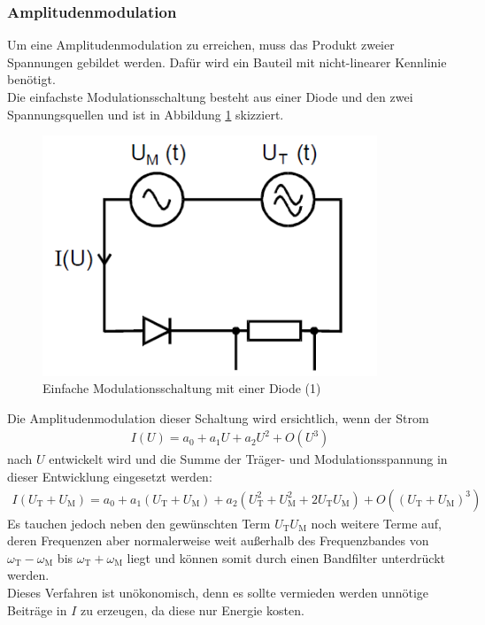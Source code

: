 \documentclass[]{scrartcl}
\begin{document}
\subsubsection*{Amplitudenmodulation}
Um eine Amplitudenmodulation zu erreichen, muss das Produkt zweier Spannungen gebildet werden. Dafür wird ein Bauteil mit nicht-linearer Kennlinie benötigt.\\
Die einfachste Modulationsschaltung besteht aus einer Diode und den zwei Spannungsquellen und ist in Abbildung \ref{fig:einfachemodulation} skizziert.
\begin{figure}[H]
\centering 
\includegraphics[width=10cm]{images/primitive_modulationsschaltung.png}
\caption{Einfache Modulationsschaltung mit einer Diode (1)}
\label{fig:einfachemodulation}
\end{figure} 
Die Amplitudenmodulation dieser Schaltung wird ersichtlich, wenn der Strom
\begin{align}
I\left(U\right)=a_0+a_1 U+a_2U^2 + O(U^3)
\end{align}
nach $U$ entwickelt wird und die Summe der Träger- und Modulationsspannung in dieser Entwicklung eingesetzt werden:
\begin{align}
I\left(U_{\text{T}}+U_{\text{M}}\right)=a_0+a_1\left(U_{\text{T}}+U_{\text{M}}\right)+a_2\left(U_{\text{T}}^2+U_{\text{M}}^2+2U_{\text{T}}U_{\text{M}}\right) + O(\left(U_{\text{T}}+U_{\text{M}}\right)^3)
\end{align}
Es tauchen jedoch neben den gewünschten Term $U_{\text{T}}U_{\text{M}}$ noch weitere Terme auf, deren Frequenzen aber normalerweise weit außerhalb des Frequenzbandes von $\omega_{\text{T}}-\omega_{\text{M}}$ bis $\omega_{\text{T}}+\omega_{\text{M}}$ liegt und können somit durch einen Bandfilter unterdrückt werden.\\
Dieses Verfahren ist unökonomisch, denn es sollte vermieden werden unnötige Beiträge in $I$ zu erzeugen, da diese nur Energie kosten.\\
\end{document}
